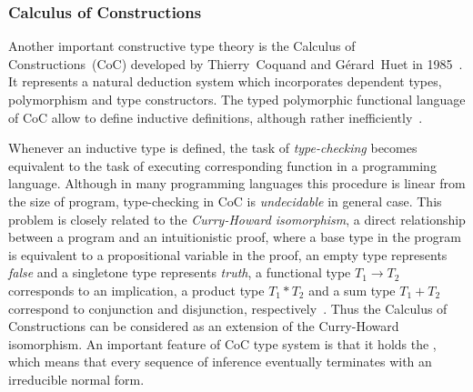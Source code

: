 \documentclass[article]{aaltoseries}
\begin{document}


\subsubsection{Calculus of Constructions}

Another important constructive type theory is the Calculus of Constructions~(CoC) developed by Thierry~Coquand and Gérard~Huet in 1985~\cite{Coq85}. It represents a natural deduction system which incorporates dependent types, polymorphism and type constructors. The typed polymorphic functional language of CoC allow to define inductive definitions, although rather inefficiently~\cite{Paulin15}.


Whenever an inductive type is defined, the task of \textit{type-checking} becomes equivalent to the task of executing corresponding function in a programming language. Although in many programming languages this procedure is linear from the size of program, type-checking in CoC is \textit{undecidable} in general case. This problem is closely related to the \textit{Curry-Howard isomorphism}, a direct relationship between a program and an intuitionistic proof, where a base type in the program is equivalent to a propositional variable in the proof, an empty type represents \textit{false} and a singletone type represents \textit{truth}, a functional type $T_{1} \rightarrow T_{2}$ corresponds to an implication, a product type $T_{1} * T_{2}$ and a sum type $T_{1} + T_{2}$ correspond to conjunction and disjunction, respectively~\cite{Pierce2002}. Thus the Calculus of Constructions can be considered as an extension of the Curry-Howard isomorphism.
An important feature of CoC type system is that it holds the , which means that every sequence of inference eventually terminates with an irreducible normal form.
\end{document}
